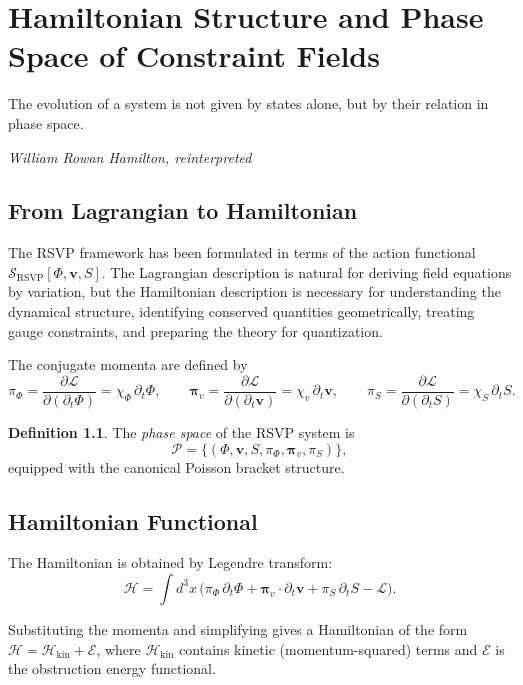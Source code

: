 \documentclass[12pt,a4paper,openany]{book}
\theoremstyle{plain}
\theoremstyle{definition}
\newtheorem{definition}[theorem]{Definition}
\theoremstyle{remark}
\begin{document}
\chapter{Hamiltonian Structure and Phase Space of Constraint Fields}
\label{chap:hamiltonian_constraint}

\epigraph{%
  The evolution of a system is not given by states alone,
  but by their relation in phase space.
}{%
  \textit{William Rowan Hamilton, reinterpreted}}

\section{From Lagrangian to Hamiltonian}

The RSVP framework has been formulated in terms of the action functional $\mathcal{S}_{\mathrm{RSVP}}[\Phi,\mathbf{v},S]$. The Lagrangian description is natural for deriving field equations by variation, but the Hamiltonian description is necessary for understanding the dynamical structure, identifying conserved quantities geometrically, treating gauge constraints, and preparing the theory for quantization.

The conjugate momenta are defined by
\[
\pi_\Phi = \frac{\partial\mathcal{L}}{\partial(\partial_t\Phi)} = \chi_\Phi\,\partial_t\Phi, \qquad
\boldsymbol{\pi}_v = \frac{\partial\mathcal{L}}{\partial(\partial_t\mathbf{v})} = \chi_v\,\partial_t\mathbf{v}, \qquad
\pi_S = \frac{\partial\mathcal{L}}{\partial(\partial_t S)} = \chi_S\,\partial_t S.
\]

\begin{definition}
The \emph{phase space} of the RSVP system is
\[
\mathcal{P} = \bigl\{(\Phi,\mathbf{v},S,\pi_\Phi,\boldsymbol{\pi}_v,\pi_S)\bigr\},
\]
equipped with the canonical Poisson bracket structure.
\end{definition}

\section{Hamiltonian Functional}

The Hamiltonian is obtained by Legendre transform:
\[
\mathcal{H} = \int d^3x\,\bigl(\pi_\Phi\,\partial_t\Phi + \boldsymbol{\pi}_v\cdot\partial_t\mathbf{v} + \pi_S\,\partial_t S - \mathcal{L}\bigr).
\]

Substituting the momenta and simplifying gives a Hamiltonian of the form $\mathcal{H} = \mathcal{H}_{\mathrm{kin}} + \mathcal{E}$, where $\mathcal{H}_{\mathrm{kin}}$ contains kinetic (momentum-squared) terms and $\mathcal{E}$ is the obstruction energy functional.
\end{document}
